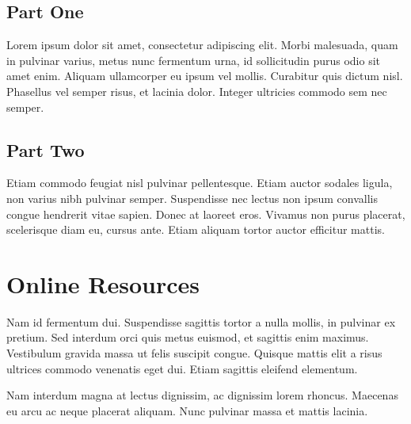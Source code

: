 \documentclass[sigconf,review,anonymous]{acmart}
\begin{document}
\subsection{Part One}

Lorem ipsum dolor sit amet, consectetur adipiscing elit. Morbi
malesuada, quam in pulvinar varius, metus nunc fermentum urna, id
sollicitudin purus odio sit amet enim. Aliquam ullamcorper eu ipsum
vel mollis. Curabitur quis dictum nisl. Phasellus vel semper risus, et
lacinia dolor. Integer ultricies commodo sem nec semper.

\subsection{Part Two}

Etiam commodo feugiat nisl pulvinar pellentesque. Etiam auctor sodales
ligula, non varius nibh pulvinar semper. Suspendisse nec lectus non
ipsum convallis congue hendrerit vitae sapien. Donec at laoreet
eros. Vivamus non purus placerat, scelerisque diam eu, cursus
ante. Etiam aliquam tortor auctor efficitur mattis.

\section{Online Resources}

Nam id fermentum dui. Suspendisse sagittis tortor a nulla mollis, in
pulvinar ex pretium. Sed interdum orci quis metus euismod, et sagittis
enim maximus. Vestibulum gravida massa ut felis suscipit
congue. Quisque mattis elit a risus ultrices commodo venenatis eget
dui. Etiam sagittis eleifend elementum.

Nam interdum magna at lectus dignissim, ac dignissim lorem
rhoncus. Maecenas eu arcu ac neque placerat aliquam. Nunc pulvinar
massa et mattis lacinia.
\fi
\end{document}
